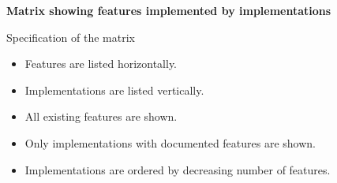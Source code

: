 \documentclass{article}
\newcommand{\flip}[1]{\begin{sideways}#1\end{sideways}}
\newcommand{\baseuri}{http://101companies.uni-koblenz.de/index.php}
\newcommand{\hLegend}[1]{#1}
\newcommand{\vLegend}[1]{#1}
\begin{document}
{


\renewcommand{\hLegend}[1]{\flip{\textbf{\href{\baseuri/101feature:#1}{#1}}}}
\renewcommand{\vLegend}[1]{\textbf{\href{\baseuri/101implementation:#1}{#1}}}

\noindent
\begin{boxedminipage}{\hsize}
\begin{center}
\bigskip

\bigskip
\end{center}
\end{boxedminipage}

}

\begin{center}
\textbf{Matrix showing features implemented by implementations}
\end{center}

\bigskip

\bigskip

\noindent
Specification of the matrix

\noindent
\begin{itemize}
\item Features are listed horizontally.
\item Implementations are listed vertically.
\item All existing features are shown.
\item Only implementations with documented features are shown.
\item Implementations are ordered by decreasing number of features.
\end{itemize}
\end{document}
